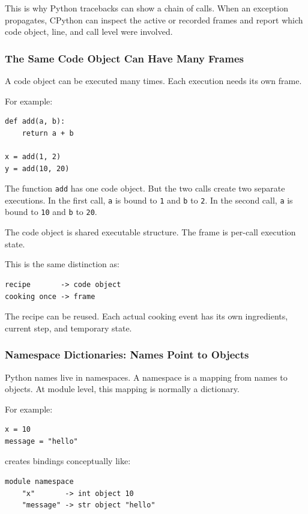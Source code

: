 This is why Python tracebacks can show a chain of calls. When an exception propagates, CPython can inspect the active or recorded frames and report which code object, line, and call level were involved.

\subsubsection{The Same Code Object Can Have Many Frames}

A code object can be executed many times. Each execution needs its own frame.

For example:

\begin{verbatim}
def add(a, b):
    return a + b

x = add(1, 2)
y = add(10, 20)
\end{verbatim}

The function \texttt{add} has one code object. But the two calls create two separate executions. In the first call, \texttt{a} is bound to \texttt{1} and \texttt{b} to \texttt{2}. In the second call, \texttt{a} is bound to \texttt{10} and \texttt{b} to \texttt{20}.

The code object is shared executable structure. The frame is per-call execution state.

This is the same distinction as:

\begin{verbatim}
recipe       -> code object
cooking once -> frame
\end{verbatim}

The recipe can be reused. Each actual cooking event has its own ingredients, current step, and temporary state.

\subsubsection{Namespace Dictionaries: Names Point to Objects}

Python names live in namespaces. A namespace is a mapping from names to objects. At module level, this mapping is normally a dictionary.

For example:

\begin{verbatim}
x = 10
message = "hello"
\end{verbatim}

creates bindings conceptually like:

\begin{verbatim}
module namespace
    "x"       -> int object 10
    "message" -> str object "hello"
\end{verbatim}

